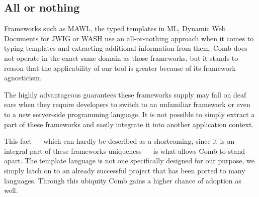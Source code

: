\documentclass[thesis.tex]{subfiles}
\begin{document}

\subsection{All or nothing}
Frameworks such as MAWL, the typed templates in ML, Dynamic Web
Documents \cite{DYNDOC} for JWIG or WASH \cite{WASH} use an all-or-nothing
approach when it comes to typing templates and extracting additional information
from them.
Comb does not operate in the exact same domain as those frameworks, but it
stands to reason that the applicability of our tool is greater because of its
framework agnosticism.

The highly advantageous guarantees these frameworks supply may fall on deaf ears
when they require developers to switch to an unfamiliar framework or even to
a new server-side programming language. It is not possible to simply extract a
part of these frameworks and easily integrate it into another application
context.

This fact --- which can hardly be described as a shortcoming, since it is an
integral part of these frameworks uniqueness --- is what allows Comb to stand
apart. The template language is not one specifically designed for our purpose,
we simply latch on to an already successful project that has been ported to many
languages. Through this ubiquity Comb gains a higher chance of adoption as well.
\end{document}
